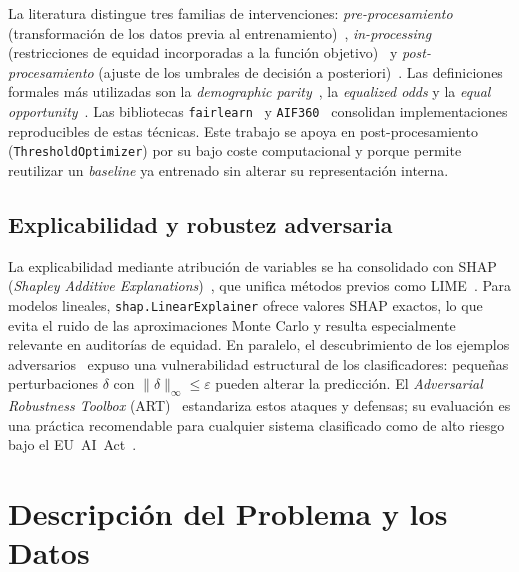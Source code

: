 \documentclass[11pt,a4paper]{article}
\begin{document}
La literatura distingue tres familias de intervenciones: \emph{pre-procesamiento} (transformación de los datos previa al entrenamiento)~\cite{kamiran2012data, calmon2017optimized}, \emph{in-processing} (restricciones de equidad incorporadas a la función objetivo)~\cite{zafar2017fairness, agarwal2018reductions} y \emph{post-procesamiento} (ajuste de los umbrales de decisión a posteriori)~\cite{hardt2016equality, pleiss2017fairness}. Las definiciones formales más utilizadas son la \textit{demographic parity}~\cite{dwork2012fairness}, la \textit{equalized odds} y la \textit{equal opportunity}~\cite{hardt2016equality}. Las bibliotecas \texttt{fairlearn}~\cite{bird2020fairlearn} y \texttt{AIF360}~\cite{bellamy2018aif360} consolidan implementaciones reproducibles de estas técnicas. Este trabajo se apoya en post-procesamiento (\texttt{ThresholdOptimizer}) por su bajo coste computacional y porque permite reutilizar un \textit{baseline} ya entrenado sin alterar su representación interna.

\subsection{Explicabilidad y robustez adversaria}

La explicabilidad mediante atribución de variables se ha consolidado con SHAP (\textit{Shapley Additive Explanations})~\cite{lundberg2017unified}, que unifica métodos previos como LIME~\cite{ribeiro2016lime}. Para modelos lineales, \texttt{shap.LinearExplainer} ofrece valores SHAP exactos, lo que evita el ruido de las aproximaciones Monte Carlo y resulta especialmente relevante en auditorías de equidad. En paralelo, el descubrimiento de los ejemplos adversarios~\cite{szegedy2014intriguing, goodfellow2015explaining} expuso una vulnerabilidad estructural de los clasificadores: pequeñas perturbaciones $\delta$ con $\|\delta\|_\infty \leq \varepsilon$ pueden alterar la predicción. El \textit{Adversarial Robustness Toolbox} (ART)~\cite{nicolae2018art} estandariza estos ataques y defensas; su evaluación es una práctica recomendable para cualquier sistema clasificado como de alto riesgo bajo el EU~AI~Act~\cite{eu_ai_act_2024}.


\section{Descripción del Problema y los Datos}
\label{sec:datos}
\end{document}
